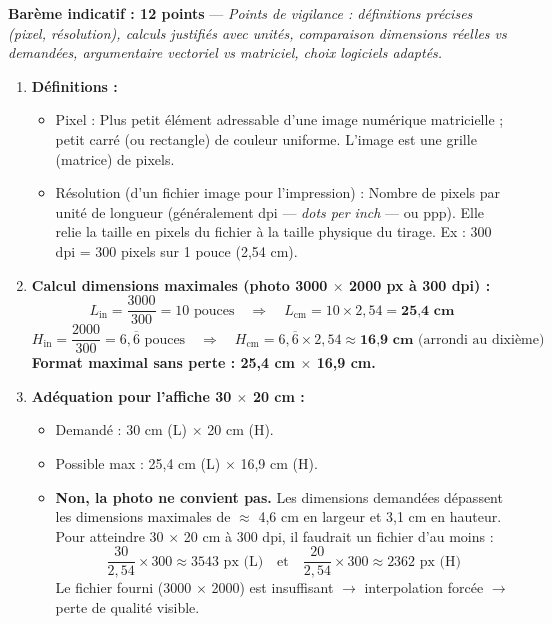 \documentclass[11pt]{article}
\newcommand{\cle}[1]{{\popxbold\color{popdark}#1}}
\begin{document}
\begin{corrige}
\textbf{Barème indicatif : 12 points} — \textit{Points de vigilance : définitions précises (pixel, résolution), calculs justifiés avec unités, comparaison dimensions réelles vs demandées, argumentaire vectoriel vs matriciel, choix logiciels adaptés.}

\begin{enumerate}
\item \textbf{Définitions :}
\begin{itemize}
\item \cle{Pixel} : Plus petit élément adressable d'une image numérique matricielle ; petit carré (ou rectangle) de couleur uniforme. L'image est une grille (matrice) de pixels.
\item \cle{Résolution} (d'un fichier image pour l'impression) : Nombre de pixels par unité de longueur (généralement \cle{dpi} — \emph{dots per inch} — ou ppp). Elle relie la taille en pixels du fichier à la taille physique du tirage. Ex : 300 dpi = 300 pixels sur 1 pouce (2,54 cm).
\end{itemize}

\item \textbf{Calcul dimensions maximales (photo 3000 $\times$ 2000 px à 300 dpi) :}
\[
L_{\text{in}} = \frac{3000}{300} = 10 \text{ pouces} \quad\Rightarrow\quad L_{\text{cm}} = 10 \times 2,54 = \textbf{25,4 cm}
\]
\[
H_{\text{in}} = \frac{2000}{300} = 6,\overline{6} \text{ pouces} \quad\Rightarrow\quad H_{\text{cm}} = 6,\overline{6} \times 2,54 \approx \textbf{16,9 cm} \text{ (arrondi au dixième)}
\]
\textbf{Format maximal sans perte : 25,4 cm $\times$ 16,9 cm.}

\item \textbf{Adéquation pour l'affiche 30 $\times$ 20 cm :}
\begin{itemize}
\item Demandé : 30 cm (L) $\times$ 20 cm (H).
\item Possible max : 25,4 cm (L) $\times$ 16,9 cm (H).
\item \textbf{Non, la photo ne convient pas.} Les dimensions demandées dépassent les dimensions maximales de $\approx$ 4,6 cm en largeur et 3,1 cm en hauteur. Pour atteindre 30 $\times$ 20 cm à 300 dpi, il faudrait un fichier d'au moins :
\[
\frac{30}{2,54} \times 300 \approx 3543 \text{ px (L)} \quad\text{et}\quad \frac{20}{2,54} \times 300 \approx 2362 \text{ px (H)}
\]
Le fichier fourni (3000 $\times$ 2000) est insuffisant $\rightarrow$ interpolation forcée $\rightarrow$ perte de qualité visible.
\end{itemize}


\end{enumerate}
\end{corrige}
\end{document}

